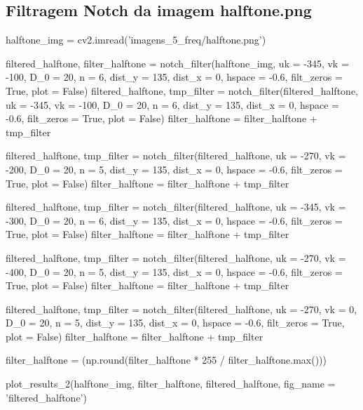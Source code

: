 \documentclass{article}
\begin{document}
\subsection{Filtragem Notch da imagem halftone.png}
\label{cod:halftone}
\begin{python}
halftone_img = cv2.imread('imagens_5_freq/halftone.png')

filtered_halftone, filter_halftone = notch_filter(halftone_img, uk = -345, vk = -100, D_0 = 20, n = 6, 
dist_y = 135, dist_x = 0, hspace = -0.6, filt_zeros = True, plot = False)
filtered_halftone, tmp_filter = notch_filter(filtered_halftone, uk = -345, vk = -100, D_0 = 20, n = 6, 
dist_y = 135, dist_x = 0, hspace = -0.6, filt_zeros = True, plot = False)
filter_halftone = filter_halftone + tmp_filter


filtered_halftone, tmp_filter = notch_filter(filtered_halftone, uk = -270, vk = -200, D_0 = 20, n = 5, 
dist_y = 135, dist_x = 0, hspace = -0.6, filt_zeros = True, plot = False)
filter_halftone = filter_halftone + tmp_filter


filtered_halftone, tmp_filter = notch_filter(filtered_halftone, uk = -345, vk = -300, D_0 = 20, n = 6, 
dist_y = 135, dist_x = 0, hspace = -0.6, filt_zeros = True, plot = False)
filter_halftone = filter_halftone + tmp_filter


filtered_halftone, tmp_filter = notch_filter(filtered_halftone, uk = -270, vk = -400, D_0 = 20, n = 5, 
dist_y = 135, dist_x = 0, hspace = -0.6, filt_zeros = True, plot = False)
filter_halftone = filter_halftone + tmp_filter


filtered_halftone, tmp_filter = notch_filter(filtered_halftone, uk = -270, vk = 0, D_0 = 20, n = 5, 
dist_y = 135, dist_x = 0, hspace = -0.6, filt_zeros = True, plot = False)
filter_halftone = filter_halftone + tmp_filter

filter_halftone = (np.round(filter_halftone * 255 / filter_halftone.max()))


plot_results_2(halftone_img, filter_halftone, filtered_halftone, fig_name = 'filtered_halftone')
\end{python}
\end{document}
